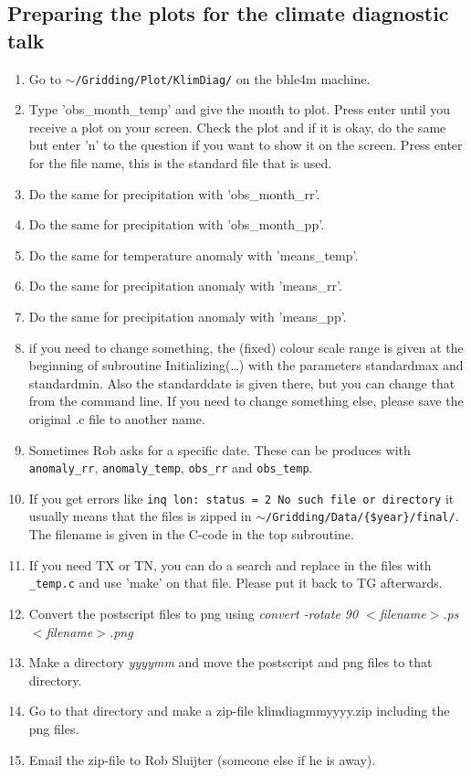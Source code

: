 \documentclass[a4paper]{article}
\begin{document}
\subsection{Preparing the plots for the climate diagnostic talk}
\begin{enumerate}
\item Go to \texttt{$\sim$/Gridding/Plot/KlimDiag/} on the bhle4m
  machine.
\item Type 'obs\_month\_temp' and give the month to plot. Press enter
  until you receive a plot on your screen. Check the plot and if it is
  okay, do the same but enter 'n' to the question if you want to show
  it on the screen. Press enter for the file name, this is the
  standard file that is used.
\item Do the same for precipitation with 'obs\_month\_rr'.
\item Do the same for precipitation with 'obs\_month\_pp'.
\item Do the same for temperature anomaly with 'means\_temp'.
\item Do the same for precipitation anomaly with 'means\_rr'.
\item Do the same for precipitation anomaly with 'means\_pp'.
\item if you need to change something, the (fixed) colour scale range
  is given at the beginning of subroutine Initializing(\dots) with the
  parameters standardmax and standardmin. Also the standarddate is
  given there, but you can change that from the command line. If you
  need to change something else, please save the original .c file to
  another name.
\item Sometimes Rob asks for a specific date. These can be produces
  with \texttt{anomaly\_rr}, \texttt{anomaly\_temp}, \texttt{obs\_rr}
  and \texttt{obs\_temp}.
\item If you get errors like \texttt{inq lon: status = 2 No such file
    or directory} it usually means that the files is zipped in
  \texttt{$\sim$/Gridding/Data/\{\$year\}/final/}. The filename is given in
  the C-code in the top subroutine.
\item If you need TX or TN, you can do a search and replace in the
  files with \texttt{\_temp.c} and use 'make' on that file. Please put
  it back to TG afterwards.
\item Convert the postscript files to png using \textit{convert
    -rotate 90 $<$filename$>$.ps $<$filename$>$.png}
\item Make a directory \textit{yyyymm} and move the postscript and png
  files to that directory.
\item Go to that directory and make a zip-file klimdiagmmyyyy.zip
  including the png files.
\item Email the zip-file to Rob Sluijter (someone else if he is away).
\end{enumerate}
\end{document}
